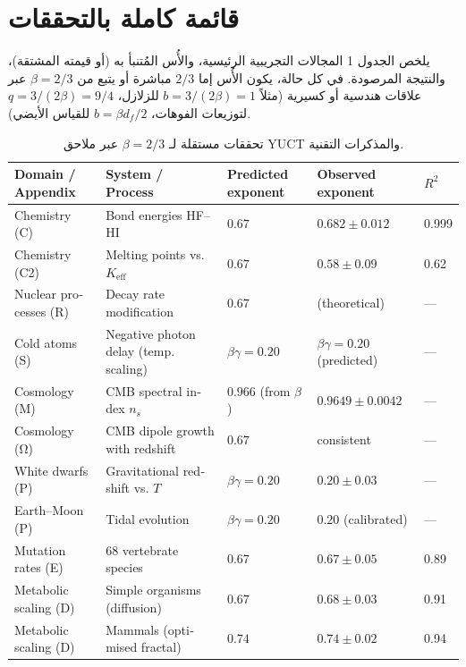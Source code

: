 \documentclass[11pt,a4paper]{article}
\newcommand{\betaf}{\beta}
\begin{document}
	\section{قائمة كاملة بالتحققات}
	
	يلخص الجدول 1 المجالات التجريبية الرئيسية، والأُس المُتنبأ به (أو قيمته المشتقة)، والنتيجة المرصودة. في كل حالة، يكون الأُس إما \(2/3\) مباشرة أو يتبع من \(\betaf = 2/3\) عبر علاقات هندسية أو كسيرية (مثلاً \(b = 3/(2\betaf) = 1\) للزلازل، \(q = 3/(2\betaf) = 9/4\) لتوزيعات الفوهات، \(b = \betaf d_f/2\) للقياس الأيضي).
	
	\begin{otherlanguage}{english}   %
		\begin{table}[htbp]
			\centering
			\caption{تحققات مستقلة لـ \(\betaf = 2/3\) عبر ملاحق YUCT والمذكرات التقنية.}
			\label{tab:full}
			\footnotesize
			\begin{tabular}{p{3.5cm}p{5.0cm}p{2.1cm}p{3.5cm}p{1.4cm}}
				\toprule
				\textbf{Domain / Appendix} & \textbf{System / Process} & \textbf{Predicted exponent} & \textbf{Observed exponent} & \(R^2\) \\
				\midrule
				Chemistry (C) & Bond energies HF–HI & \(0.67\) & \(0.682 \pm 0.012\) & 0.999 \\
				Chemistry (C2) & Melting points vs. \(K_{\mathrm{eff}}\) & \(0.67\) & \(0.58 \pm 0.09\) & 0.62 \\
				Nuclear processes (R) & Decay rate modification & \(0.67\) & (theoretical) & — \\
				Cold atoms (S) & Negative photon delay (temp. scaling) & \(\beta\gamma = 0.20\) & \(\beta\gamma = 0.20\) (predicted) & — \\
				Cosmology (M) & CMB spectral index \(n_s\) & \(0.966\) (from \(\beta\)) & \(0.9649 \pm 0.0042\) & — \\
				Cosmology (Ω) & CMB dipole growth with redshift & \(0.67\) & consistent & — \\
				White dwarfs (P) & Gravitational redshift vs. \(T\) & \(\beta\gamma = 0.20\) & \(0.20 \pm 0.03\) & — \\
				Earth–Moon (P) & Tidal evolution & \(\beta\gamma = 0.20\) & \(0.20\) (calibrated) & — \\
				Mutation rates (E) & 68 vertebrate species & \(0.67\) & \(0.67 \pm 0.05\) & 0.89 \\
				Metabolic scaling (D) & Simple organisms (diffusion) & \(0.67\) & \(0.68 \pm 0.03\) & 0.91 \\
				Metabolic scaling (D) & Mammals (optimised fractal) & \(0.74\) & \(0.74 \pm 0.02\) & 0.94 \\

\end{tabular}
\end{table}
\end{otherlanguage}
\end{document}
